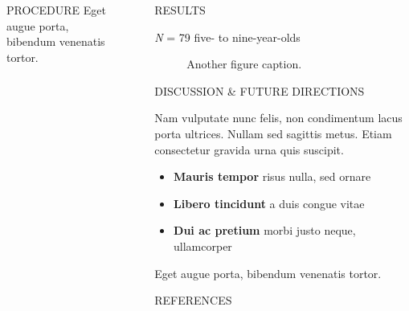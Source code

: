 \documentclass[final]{beamer}
\newlength{\sepwidth}
\newlength{\colwidth}
\newlength{\widecolwidth}
\newcommand{\separatorcolumn}{\begin{column}{\sepwidth}\end{column}}
\begin{document}
\begin{frame}[t]
\begin{columns}[t]
\begin{column}{\colwidth}
\begin{block}{PROCEDURE}
    Eget augue porta, bibendum venenatis tortor.

  \end{block}

\end{column}

\separatorcolumn

\begin{column}{\widecolwidth}

  \begin{block}{RESULTS}
  
  \emph{N} = 79 five- to nine-year-olds

    \begin{figure}
      \centering
      \caption{Another figure caption.}
    \end{figure}

  \end{block}
    
      \begin{block}{DISCUSSION \& FUTURE DIRECTIONS}

    Nam vulputate nunc felis, non condimentum lacus porta ultrices. Nullam sed
    sagittis metus. Etiam consectetur gravida urna quis suscipit.

    \begin{itemize}
      \item \textbf{Mauris tempor} risus nulla, sed ornare
      \item \textbf{Libero tincidunt} a duis congue vitae
      \item \textbf{Dui ac pretium} morbi justo neque, ullamcorper
    \end{itemize}

    Eget augue porta, bibendum venenatis tortor.

  \end{block}

  \begin{block}{REFERENCES}

    \nocite{*}
    \footnotesize{}

  \end{block}

\end{column}
\end{columns}
\end{frame}
\end{document}
